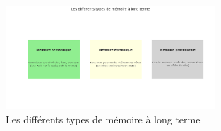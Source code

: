 \documentclass[11pt,a4paper]{report}
\begin{document}
\begin{figure}[h]
    \centering
    \includegraphics[width=0.7\textwidth]{images/1.1.2.png}
    \caption{Les différents types de mémoire à long terme}
    \label{fig:1.1.2}
\end{figure}
\end{document}
